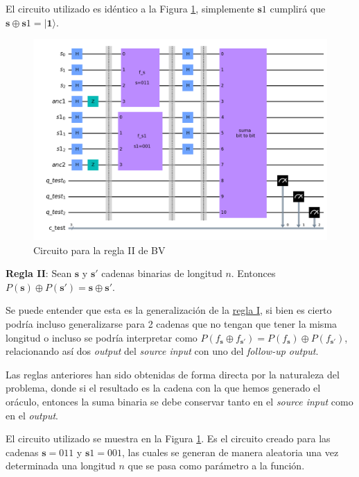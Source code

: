  El circuito utilizado es idéntico a la Figura \ref{Fig:CircuitoBVReglaII}, simplemente $\mathbf{s}1$ cumplirá que $\mathbf{s}\oplus\mathbf{s}1=|\mathbf{1}\rangle$.

\begin{figure}[H]
    \centering
    \includegraphics[width=\textwidth]{TFG/imagenes/BVReglaII.png}
    \caption{Circuito para la regla II de BV}
    \label{Fig:CircuitoBVReglaII}
 \end{figure}


\textbf{Regla II}: Sean $\mathbf{s}$ y $\mathbf{s}'$ cadenas binarias de longitud $n$. Entonces $P(\mathbf{s})\oplus P(\mathbf{s}')=\mathbf{s} \oplus \mathbf{s}'$.\newline

 Se puede entender que esta es la generalización de la \hyperref[R:BV:1]{regla I}, si bien es cierto podría incluso generalizarse para 2 cadenas que no tengan que tener la misma longitud o incluso se podría interpretar como $P(f_{\mathbf{s}
}\oplus f_{\mathbf{s}'})=P(f_{\mathbf{s}})\oplus P(f_{\mathbf{s}'})$, relacionando así dos \textit{output} del \textit{source input} con uno del \textit{follow-up output}.\newline

 Las reglas anteriores han sido obtenidas de forma directa por la naturaleza del problema, donde si el resultado es la cadena con la que hemos generado el oráculo, entonces la suma binaria se debe conservar tanto en el \textit{source input} como en el \textit{output}.\newline

 El circuito utilizado se muestra en la Figura \ref{Fig:CircuitoBVReglaII}. Es el circuito creado para las cadenas $\mathbf{s}=011$ y $\mathbf{s}1=001$, las cuales se generan de manera aleatoria una vez determinada una longitud $n$ que se pasa como parámetro a la función.\newline

